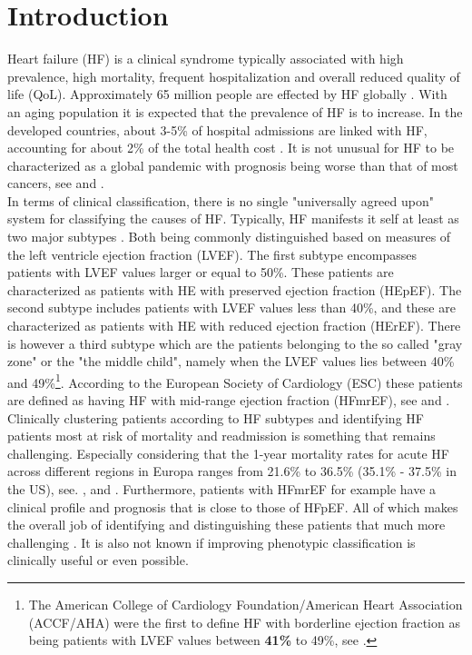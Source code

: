\documentclass[../thesis.tex]{subfiles}
\begin{document}
\chapter{Introduction}
\label{chap:intro}

\noindent  Heart failure (HF) is a clinical syndrome typically associated with high prevalence, high mortality, frequent hospitalization and overall reduced quality of life (QoL). Approximately 65 million people are effected by HF globally \citep{hay2017global}. With an aging population it is expected that the prevalence of HF is to increase. In the developed countries, about 3-5\% of hospital admissions are linked with HF, accounting for about 2\% of the total health cost \citep{tripoliti2017heart}. It is not unusual for HF to be characterized as a global pandemic with prognosis being worse than that of most cancers, see \cite{braunwald2015war} and \cite{savarese2017global}.\\
\indent In terms of clinical classification, there is no single "universally agreed upon" system for classifying the causes of HF. Typically, HF manifests it self at least as two major subtypes \citep{alonso2015exploring}. Both being commonly distinguished based on measures of the left ventricle ejection fraction (LVEF). The first subtype encompasses patients with LVEF values larger or equal to 50\%. These patients are characterized as patients with HE with preserved ejection fraction (HEpEF). The second subtype includes patients with LVEF values less than 40\%, and these are characterized as patients with HE with reduced ejection fraction (HErEF). There is however a third subtype which are the patients belonging to the so called "gray zone" or the "the middle child", namely when the LVEF values lies between 40\% and 49\%\footnote{The American College of Cardiology Foundation/American Heart Association (ACCF/AHA) were the first to define HF with borderline ejection fraction as being patients with LVEF values between \textbf{41\%} to 49\%, see \cite{yancy2013}.}. According to the European Society of Cardiology (ESC) these patients are defined as having HF with mid-range ejection fraction (HFmrEF), see \cite{lam2014middle} and \cite{ponikowski20162016}. Clinically clustering patients according to HF subtypes and identifying HF patients most at risk of mortality and readmission is something that remains challenging. Especially considering that the 1-year mortality rates for acute HF across different regions in Europa ranges from 21.6\% to 36.5\% (35.1\% - 37.5\% in the US), see. \cite{cheng2014outcomes}, \cite{inamdar2016heart} and \cite{crespo2016european}. Furthermore, patients with HFmrEF for example have a clinical profile and prognosis that is close to those of HFpEF. All of which makes the overall job of identifying and distinguishing these patients that much more challenging \citep{hsu2017heart}. It is also not known if improving phenotypic classification is clinically useful or even possible.\\
\end{document}
